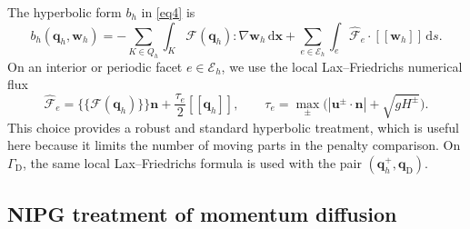 \documentclass[pdflatex,sn-mathphys-num]{sn-jnl}%
\theoremstyle{thmstyleone}%
\theoremstyle{thmstyletwo}%
\theoremstyle{thmstylethree}%
\begin{document}
The hyperbolic form $b_h$ in \eqref{eq4} is
\begin{equation}
\label{eq6}
b_h(\mathbf q_h,\mathbf w_h)
=-\sum_{K\in Q_h}\int_K\mathcal F(\mathbf q_h):\nabla\mathbf w_h\,\mathrm d\mathbf x
+\sum_{e\in\mathcal E_h}\int_e\widehat{\mathcal F}_e\cdot[[\mathbf w_h]]\,\mathrm ds.
\end{equation}
On an interior or periodic facet $e \in \mathcal{E}_h$, we use the local Lax--Friedrichs numerical flux \cite{Toro1992}
\[
\widehat{\mathcal F}_e
=\{\!\{\mathcal F(\mathbf q_h)\}\!\}\mathbf n
+\frac{\tau_e}{2}[[\mathbf q_h]],
\qquad
\tau_e=\max_{\pm}\bigl(|\mathbf u^\pm\cdot\mathbf n|+\sqrt{gH^\pm}\bigr).
\]
This choice provides a robust and standard hyperbolic treatment, which is useful here because it limits the number of moving parts in the penalty comparison.
On $\Gamma_{\mathrm D}$, the same local Lax--Friedrichs formula is used with the pair $(\mathbf q_h^+,\mathbf q_{\mathrm D})$. 

\subsection{NIPG treatment of momentum diffusion}
\end{document}
